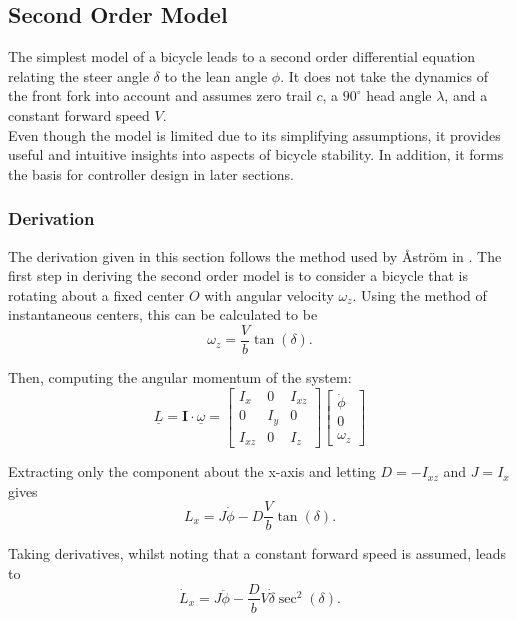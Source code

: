 \subsection{Second Order Model} \label{SecondOrder}
The simplest model of a bicycle leads to a second order differential equation relating the steer angle $\delta$ to the lean angle $\phi$. It does not take the dynamics of the front fork into account and assumes zero trail $c$, a $90^{\circ}$ head angle $\lambda$, and a constant forward speed $V$. \\

Even though the model is limited due to its simplifying assumptions, it provides useful and intuitive insights into aspects of bicycle stability. In addition, it forms the basis for controller design in later sections.

\subsubsection{Derivation}
The derivation given in this section follows the method used by {\AA}str{\"o}m in \cite{astrom}. The first step in deriving the second order model is to consider a bicycle that is rotating about a fixed center $O$ with angular velocity $\omega_z$. Using the method of instantaneous centers, this can be calculated to be
\begin{equation*}
\omega_z = \frac{V}{b} \tan{(\delta)}.
\end{equation*}

Then, computing the angular momentum of the system:
\begin{equation*}
\underline{L} = \mathbf{I} \cdot \underline{\omega} = \begin{bmatrix}
I_x & 0 & I_{xz} \\
0 & I_y & 0 \\
I_{xz} & 0 & I_z
\end{bmatrix} \begin{bmatrix}
\dot{\phi} \\
0 \\
\omega_z
\end{bmatrix}
\end{equation*}

Extracting only the component about the x-axis and letting $D=-I_{xz}$ and $J=I_x$ gives
\begin{equation*}
L_x = J \dot{\phi} - D \frac{V}{b} \tan{(\delta)}.
\end{equation*}

Taking derivatives, whilst noting that a constant forward speed is assumed, leads to
\begin{equation*}
\dot{L}_x = J \ddot{\phi} - \frac{D}{b} V \dot{\delta} \sec^2{(\delta)}.
\end{equation*}

